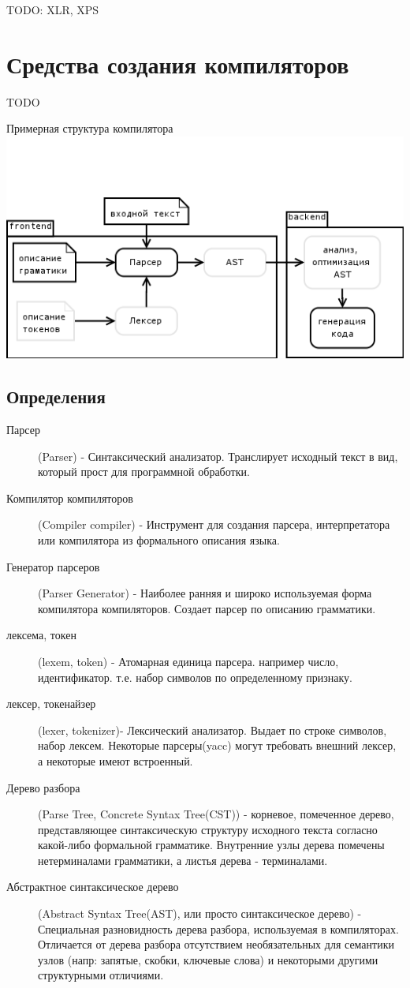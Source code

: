 \documentclass[a4paper,12pt]{article}
\begin{document}
TODO: XLR, XPS

\section{Средства создания компиляторов}

TODO
\begin{center}
 Примерная структура компилятора
 \includegraphics[scale=0.6]{img/compiler.png}
\end{center}

\subsection{Определения}
\begin{description}
  \item[Парсер] (Parser) -
    Синтаксический анализатор. Транслирует исходный текст в вид, который прост
    для программной обработки.
  \item[Компилятор компиляторов] (Compiler compiler) -
	Инструмент для создания парсера, интерпретатора или компилятора из формального
	описания языка.
  \item[Генератор парсеров] (Parser Generator) -
  	Наиболее ранняя и широко используемая форма компилятора компиляторов.
  	Создает парсер по описанию грамматики. 
  \item[лексема, токен] (lexem, token) - 
  	Атомарная единица парсера. например число, идентификатор. т.е. набор
  	символов по определенному признаку.
  \item[лексер, токенайзер] (lexer, tokenizer)-
  	Лексический анализатор. Выдает по строке символов, набор лексем. Некоторые
  	парсеры(yacc) могут требовать внешний лексер, а некоторые имеют встроенный.
  \item[Дерево разбора] (Parse Tree, Concrete Syntax Tree(CST)) -
  	корневое, помеченное дерево, представляющее синтаксическую структуру
  	исходного текста согласно какой-либо формальной грамматике. Внутренние узлы
  	дерева помечены нетерминалами грамматики, а листья дерева - терминалами.
  \item[Абстрактное синтаксическое дерево] (Abstract Syntax Tree(AST), или
  просто синтаксическое дерево) - Специальная разновидность дерева разбора,
  используемая в компиляторах. Отличается от дерева разбора отсутствием
  необязательных для семантики узлов (напр: запятые, скобки, ключевые слова) и
  некоторыми другими структурными отличиями.
\end{description}
\end{document}
